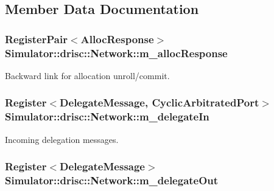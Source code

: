 \subsection{Member Data Documentation}
\hypertarget{class_simulator_1_1drisc_1_1_network_a642e45336ed4f3010df7413c072b5a16}{
\subsubsection[{m\+\_\+alloc\+Response}]{\setlength{\rightskip}{0pt plus 5cm}Register\+Pair$<${\bf Alloc\+Response}$>$ Simulator\+::drisc\+::\+Network\+::m\+\_\+alloc\+Response}}\label{class_simulator_1_1drisc_1_1_network_a642e45336ed4f3010df7413c072b5a16}


Backward link for allocation unroll/commit. 

\hypertarget{class_simulator_1_1drisc_1_1_network_ae0dd43a086bf345947dc0fdfaebe5da4}{
\subsubsection[{m\+\_\+delegate\+In}]{\setlength{\rightskip}{0pt plus 5cm}Register$<$Delegate\+Message, {\bf Cyclic\+Arbitrated\+Port}$>$ Simulator\+::drisc\+::\+Network\+::m\+\_\+delegate\+In}}\label{class_simulator_1_1drisc_1_1_network_ae0dd43a086bf345947dc0fdfaebe5da4}


Incoming delegation messages. 

\hypertarget{class_simulator_1_1drisc_1_1_network_a05f8e1a534e761cde43203c1ff12ffdc}{
\subsubsection[{m\+\_\+delegate\+Out}]{\setlength{\rightskip}{0pt plus 5cm}Register$<$Delegate\+Message$>$ Simulator\+::drisc\+::\+Network\+::m\+\_\+delegate\+Out}}\label{class_simulator_1_1drisc_1_1_network_a05f8e1a534e761cde43203c1ff12ffdc}


